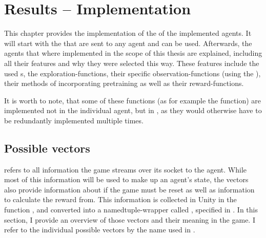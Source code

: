 \chapter{Results -- Implementation}

\label{ch:implementationresults}

This chapter provides the implementation of the  of the implemented agents. It will start with the  that are sent to any agent and can be used. Afterwards, the agents that where implemented in the scope of this thesis are explained, including all their features and why they were selected this way. These features include the used s, the exploration-functions, their specific observation-functions (using the ), their methods of incorporating pretraining as well as their reward-functions. 

It is worth to note, that some of these functions (as for example the  function) are implemented not in the individual agent, but in , as they would otherwise have to be redundantly implemented multiple times.

\section{Possible vectors}

\label{ch:thevectors}


 refers to all information the game streams over its socket to the agent. While most of this information will be used to make up an agent's state, the vectors also provide information about if the game must be reset as well as information to calculate the reward from. This information is collected in Unity in the function , and converted into a namedtuple-wrapper called , specified in . In this section, I provide an overview of those vectors and their meaning in the game. I refer to the individual possible vectors by the name used in .

